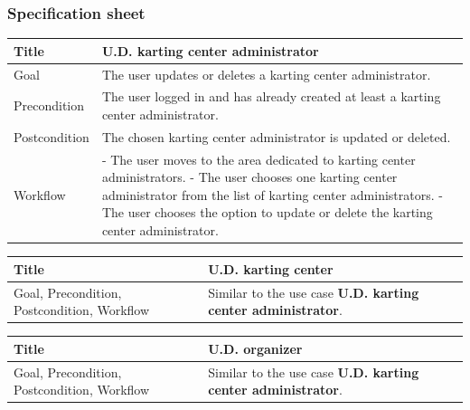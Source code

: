 \documentclass{beamer}
\begin{document}
\begin{frame}
    \frametitle{Specification sheet}
    \begin{table}
        \tiny
        \begin{tabular}{|p{2cm}|p{6cm}|}
        \hline  
        Title & \textbf{U.D. karting center administrator} \\
        \hline
        Goal & The user updates or deletes a karting center administrator. \\
        \hline
        Precondition & The user logged in and has already created at least a karting center
        administrator. \\
        \hline
        Postcondition & The chosen karting center administrator is updated or deleted. \\
        \hline
        Workflow &
        - The user moves to the area dedicated to karting center administrators. \newline
        - The user chooses one karting center administrator from the
        list of karting center administrators. \newline
        - The user chooses the option to update or delete the karting center administrator. \\
        \hline
        \end{tabular}
\end{table}

\begin{table}
    \tiny
    \begin{tabular}{|p{2cm}|p{6cm}|}
    \hline  
    Title & \textbf{U.D. karting center} \\
    \hline
    Goal, Precondition, Postcondition, Workflow & Similar 
    to the use case \textbf{U.D. karting center administrator}. \\
    \hline
    \end{tabular}
\end{table}

\begin{table}
    \tiny
    \begin{tabular}{|p{2cm}|p{6cm}|}
    \hline  
    Title & \textbf{U.D. organizer} \\
    \hline
    Goal, Precondition, Postcondition, Workflow & Similar 
    to the use case \textbf{U.D. karting center administrator}. \\
    \hline
    \end{tabular}
\end{table}

\end{frame}
\end{document}
